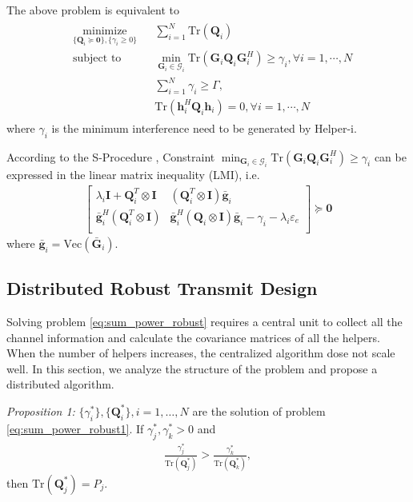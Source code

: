 \documentclass[journal]{IEEEtran}
\begin{document}
The above problem is equivalent to 
\begin{eqnarray}
\begin{aligned} \label{eq:sum_power_robust1}
	& \underset{\{\mathbf{Q}_i \succeq \mathbf{0}\}, \{\gamma_i \geq 0\}}{\text{minimize}}
	& & \sum_{i=1}^{N}\text{Tr}(\mathbf{Q}_i)\\
	& \text{subject to}
	& & \min_{\mathbf{G}_i \in \mathcal{G}_i}\text{Tr}\left(\mathbf{G}_i\mathbf{Q}_i\mathbf{G}_i^H\right) \geq \gamma_i, \forall i = 1,\cdots, N\\
	&&& \sum_{i = 1}^{N}\gamma_i \geq \Gamma,\\
&&&\text{Tr}\left(\mathbf{h}_i^H\mathbf{Q}_i\mathbf{h}_i\right) = 0, \forall i = 1, \cdots, N
\end{aligned}
\end{eqnarray}
where $\gamma_i$ is the minimum interference need to be generated by Helper-i. 

According to the S-Procedure \cite{ConvexOpt_Boyd}, Constraint $\min_{\mathbf{G}_i \in \mathcal{G}_i}\text{Tr}\left(\mathbf{G}_i\mathbf{Q}_i\mathbf{G}_i^H\right) \geq \gamma_i$ can be expressed in the linear matrix inequality (LMI), i.e.
\begin{eqnarray}
\left[ {\begin{array}{cc}
	\lambda_i\mathbf{I} +\mathbf{Q}_i^T \otimes \mathbf{I}  & \left(\mathbf{Q}_i^T \otimes \mathbf{I}\right) \bar{\mathbf{g}}_i \\
	\bar{\mathbf{g}}_i^H \left(\mathbf{Q}_i^T \otimes \mathbf{I}\right)& \bar{\mathbf{g}}_i^H\left(\mathbf{Q}_i \otimes \mathbf{I}\right)\bar{\mathbf{g}} _i- \gamma_i -\lambda_i\varepsilon_e\\
	\end{array} } \right] \succeq \mathbf{0}
\end{eqnarray}
where $\bar{\mathbf{g}}_i = \text{Vec}(\bar{\mathbf{G}}_i)$.

\subsection{Distributed Robust Transmit Design}
Solving problem \eqref{eq:sum_power_robust} requires a central unit to collect all the channel information and calculate the covariance matrices of all the helpers. When the number of helpers increases, the centralized algorithm dose not scale well. 
In this section, we analyze the structure of the problem and propose a distributed algorithm. 

\emph{Proposition 1:} $\{\gamma_i^*\}, \{\mathbf{Q}_i^*\}, i = 1, \ldots, N$ are the solution of problem \eqref{eq:sum_power_robust1}. If $\gamma_j^*, \gamma_k^*> 0$ and 
\begin{eqnarray}
\frac{\gamma_j^*}{\mathrm{Tr}(\mathbf{Q}_j^*)} > \frac{\gamma_k^*}{\mathrm{Tr}(\mathbf{Q}_k^*)} \label{eq:efficiency},
\end{eqnarray}
then $\mathrm{Tr}(\mathbf{Q}_j^*) = P_j$.
\end{document}
